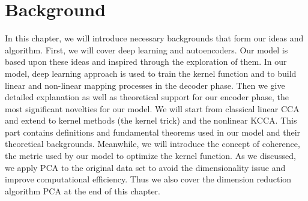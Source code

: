 \documentclass[12pt]{report} %
\begin{document}
\chapter{Background}
In this chapter, we will introduce necessary backgrounds that form our ideas and algorithm. First, we will cover deep learning and autoencoders. Our model is based upon these ideas and inspired through the exploration of them. In our model, deep learning approach is used to train the kernel function and to build linear and non-linear mapping processes in the decoder phase. 
Then we give detailed explanation as well as theoretical support for our encoder phase, the most significant novelties for our model. We will start from classical linear CCA and extend to kernel methods (the kernel trick) and the nonlinear KCCA. This part contains definitions and fundamental theorems used in our model and their theoretical backgrounds. Meanwhile, we will introduce the concept of coherence, the metric used by our model to optimize the kernel function. 
As we discussed, we apply PCA to the original data set to avoid the dimensionality issue and improve computational efficiency. Thus we also cover the dimension reduction algorithm PCA at the end of this chapter. 
\end{document}
